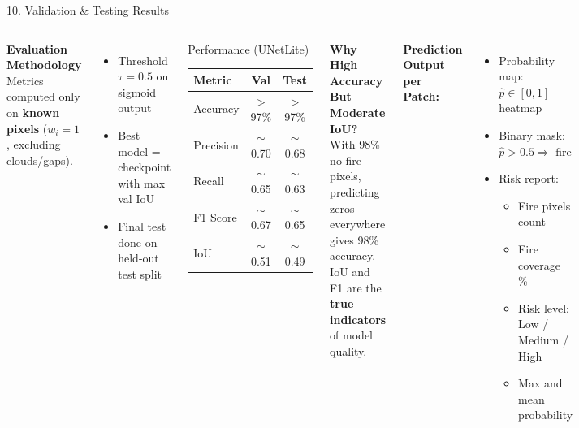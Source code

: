 ﻿\documentclass[aspectratio=169,t]{beamer}
\begin{document}
\begin{frame}{10. Validation \& Testing Results}
\begin{columns}[t]
\textcolor{accent}{\textbf{Evaluation Methodology}}\\[0.1cm]
\small Metrics computed only on \textbf{known pixels} ($w_i = 1$, excluding clouds/gaps).
\vspace{0.15cm}
\begin{itemize}
  \item Threshold $\tau = 0.5$ on sigmoid output
  \item Best model = checkpoint with max val IoU
  \item Final test done on held-out test split
\end{itemize}
\vspace{0.2cm}
\begin{block}{Performance (UNetLite)}
\small
\begin{tabular}{lcc}
\toprule
\textcolor{accent}{Metric}    & \textcolor{accent}{Val} & \textcolor{accent}{Test} \\
\midrule
Accuracy  & $>$97\% & $>$97\% \\
Precision & $\sim$0.70  & $\sim$0.68 \\
Recall    & $\sim$0.65  & $\sim$0.63 \\
F1 Score  & $\sim$0.67  & $\sim$0.65 \\
IoU       & $\sim$0.51  & $\sim$0.49 \\
\bottomrule
\end{tabular}
\end{block}
\textcolor{accent}{\textbf{Why High Accuracy But Moderate IoU?}}\\[0.1cm]
\small
With 98\% no-fire pixels, predicting zeros everywhere gives 98\% accuracy. IoU and F1 are the \textbf{true indicators} of model quality.

\vspace{0.2cm}
\textcolor{accentgreen}{\textbf{Prediction Output per Patch:}}
\begin{itemize}
  \item Probability map: $\hat{p} \in [0,1]$ heatmap
  \item Binary mask: $\hat{p} > 0.5 \Rightarrow $ fire
  \item Risk report:
    \begin{itemize}
      \item Fire pixels count
      \item Fire coverage \%
      \item Risk level: Low / Medium / High
      \item Max and mean probability
    \end{itemize}
\end{itemize}
\end{columns}
\end{frame}
\end{document}
